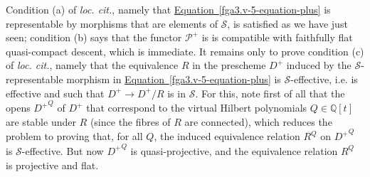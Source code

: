   Condition (a) of \emph{loc. cit.}, namely that \hyperref[fga3.v-5-equation-plus]{Equation~\ref*{fga3.v-5-equation-plus}} is representable by morphisms that are elements of \(\mathcal {S}\), is satisfied as we have just seen;
  condition (b) says that the functor \(\mathscr {P}^+\) is is compatible with faithfully flat quasi-compact descent, which is immediate.
  It remains only to prove condition (c) of \emph{loc. cit.}, namely that the equivalence \(R\) in the prescheme \(D^+\) induced by the \(\mathcal {S}\)-representable morphism in \hyperref[fga3.v-5-equation-plus]{Equation~\ref*{fga3.v-5-equation-plus}} is \(\mathcal {S}\)-effective, i.e. is effective and such that \(D^+\to  D^+/R\) is in \(\mathcal {S}\).
  For this, note first of all that the opens \({D^+}^Q\) of \(D^+\) that correspond to the virtual Hilbert polynomials \(Q\in \mathbb {Q}[t]\) are stable under \(R\) (since the fibres of \(R\) are connected), which reduces the problem to proving that, for all \(Q\), the induced equivalence relation \(R^Q\) on \({D^+}^Q\) is \(\mathcal {S}\)-effective.
  But now \({D^+}^Q\) is quasi-projective, and the equivalence relation \(R^Q\) is projective and flat.
